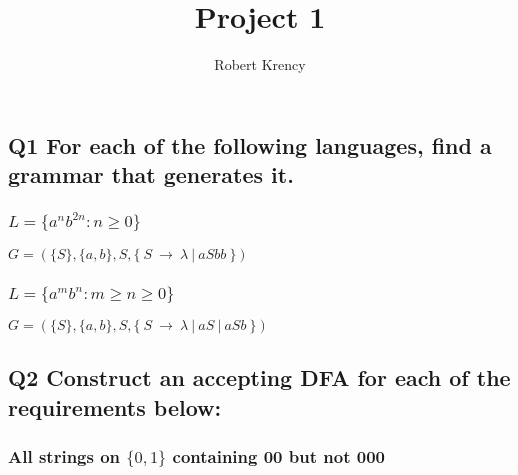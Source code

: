 \documentclass{article}
\date{}
\author{Robert Krency}
\title{Project 1}
\begin{document}
\maketitle
\thispagestyle{fancy}

\subsection*{Q1 For each of the following languages, find a grammar that generates it.}

\subsubsection*{$L = \{ a^{n}b^{2n} : n \geq 0 \}$}

\hspace*{1cm}$ G = ( \{S\}, \{a,b\}, S, \{\ S\ \rightarrow\ \lambda\ |\ aSbb\ \} ) $

\subsubsection*{$L = \{ a^{m}b^{n} : m \geq n \geq 0\}$}

\hspace*{1cm}$ G = ( \{ S \}, \{ a,b \}, S, \{\ S\ \rightarrow\ \lambda\ |\ aS\ |\ aSb\ \} ) $


\vspace{5mm}
\subsection*{Q2 Construct an accepting DFA for each of the requirements below:}

\vspace{5mm}

\subsubsection*{All strings on $\{0,1\}$ containing 00 but not 000}
\end{document}
